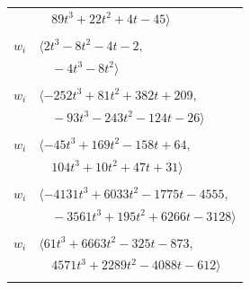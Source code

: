 \documentclass[11pt]{article}
\begin{document}
\begin{longtable}{@{}ll@{}}
 & $\quad 89t^{3}+22t^{2}+4t-45\rangle$\\
\addlinespace[2pt]
\multicolumn{2}{@{}p{0.97\textwidth}@{}}{$i=36$, $D_i=2$, $\rho_{ij}$: $2{:}1, \allowbreak 7{:}1, \allowbreak 25{:}1, \allowbreak 26{:}1, \allowbreak 29{:}2, \allowbreak 40{:}2, \allowbreak 48{:}1$}\\
$w_i$ & $\langle 2t^{3}-8t^{2}-4t-2,$\\
 & $\quad -4t^{3}-8t^{2}\rangle$\\
\addlinespace[2pt]
\multicolumn{2}{@{}p{0.97\textwidth}@{}}{$i=37$, $D_i=64$, $\rho_{ij}$: $4{:}2, \allowbreak 9{:}2, \allowbreak 13{:}2, \allowbreak 21{:}1, \allowbreak 23{:}2, \allowbreak 33{:}1, \allowbreak 35{:}1, \allowbreak 53{:}2$}\\
$w_i$ & $\langle -252t^{3}+81t^{2}+382t+209,$\\
 & $\quad -93t^{3}-243t^{2}-124t-26\rangle$\\
\addlinespace[2pt]
\multicolumn{2}{@{}p{0.97\textwidth}@{}}{$i=38$, $D_i=16$, $\rho_{ij}$: $10{:}2, \allowbreak 14{:}1, \allowbreak 19{:}2, \allowbreak 34{:}2, \allowbreak 44{:}2, \allowbreak 47{:}2, \allowbreak 57{:}2$}\\
$w_i$ & $\langle -45t^{3}+169t^{2}-158t+64,$\\
 & $\quad 104t^{3}+10t^{2}+47t+31\rangle$\\
\addlinespace[2pt]
\multicolumn{2}{@{}p{0.97\textwidth}@{}}{$i=39$, $D_i=512$, $\rho_{ij}$: $2{:}1, \allowbreak 3{:}2, \allowbreak 4{:}2, \allowbreak 7{:}2, \allowbreak 9{:}1, \allowbreak 12{:}2, \allowbreak 16{:}2, \allowbreak 19{:}2, \allowbreak 23{:}1, \allowbreak 34{:}1$}\\
$w_i$ & $\langle -4131t^{3}+6033t^{2}-1775t-4555,$\\
 & $\quad -3561t^{3}+195t^{2}+6266t-3128\rangle$\\
\addlinespace[2pt]
\multicolumn{2}{@{}p{0.97\textwidth}@{}}{$i=40$, $D_i=128$, $\rho_{ij}$: $2{:}1, \allowbreak 5{:}1, \allowbreak 7{:}2, \allowbreak 9{:}1, \allowbreak 17{:}2, \allowbreak 20{:}1, \allowbreak 32{:}2, \allowbreak 36{:}1, \allowbreak 42{:}1, \allowbreak 43{:}2, \allowbreak 48{:}1, \allowbreak 54{:}1, \allowbreak 58{:}1$}\\
$w_i$ & $\langle 61t^{3}+6663t^{2}-325t-873,$\\
 & $\quad 4571t^{3}+2289t^{2}-4088t-612\rangle$\\
\addlinespace[2pt]
\multicolumn{2}{@{}p{0.97\textwidth}@{}}{$i=41$, $D_i=4$, $\rho_{ij}$: $2{:}2, \allowbreak 18{:}1, \allowbreak 27{:}1, \allowbreak 28{:}2, \allowbreak 43{:}1, \allowbreak 46{:}1, \allowbreak 55{:}2, \allowbreak 59{:}2$}\\

\end{longtable}
\end{document}
